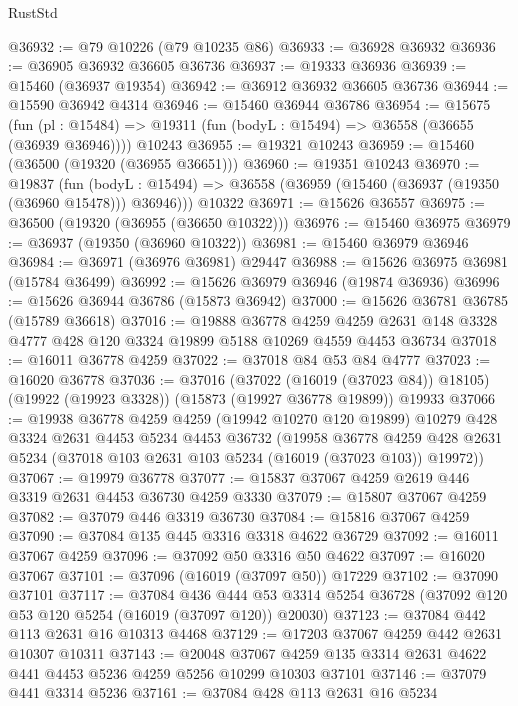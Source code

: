 \begin{lexlean}{RustStd}
\begin{coremodule}
@36932 := @79 @10226 (@79 @10235 @86)
@36933 := @36928 @36932
@36936 := @36905 @36932 @36605 @36736
@36937 := @19333 @36936
@36939 := @15460 (@36937 @19354)
@36942 := @36912 @36932 @36605 @36736
@36944 := @15590 @36942 @4314
@36946 := @15460 @36944 @36786
@36954 := @15675
    (fun (pl : @15484) => @19311 (fun (bodyL : @15494) => @36558 (@36655 (@36939 @36946))))
    @10243
@36955 := @19321 @10243
@36959 := @15460 (@36500 (@19320 (@36955 @36651)))
@36960 := @19351 @10243
@36970 := @19837
    (fun (bodyL : @15494) => @36558 (@36959 (@15460 (@36937 (@19350 (@36960 @15478))) @36946)))
    @10322
@36971 := @15626 @36557
@36975 := @36500 (@19320 (@36955 (@36650 @10322)))
@36976 := @15460 @36975
@36979 := @36937 (@19350 (@36960 @10322))
@36981 := @15460 @36979 @36946
@36984 := @36971 (@36976 @36981) @29447
@36988 := @15626 @36975 @36981 (@15784 @36499)
@36992 := @15626 @36979 @36946 (@19874 @36936)
@36996 := @15626 @36944 @36786 (@15873 @36942)
@37000 := @15626 @36781 @36785 (@15789 @36618)
@37016 := @19888
    @36778
    @4259
    @4259
    @2631
    @148
    @3328
    @4777
    @428
    @120
    @3324
    @19899
    @5188
    @10269
    @4559
    @4453
    @36734
@37018 := @16011 @36778 @4259
@37022 := @37018 @84 @53 @84 @4777
@37023 := @16020 @36778
@37036 := @37016
    (@37022 (@16019 (@37023 @84)) @18105)
    (@19922 (@19923 @3328))
    (@15873 (@19927 @36778 @19899))
    @19933
@37066 := @19938
    @36778
    @4259
    @4259
    (@19942 @10270 @120 @19899)
    @10279
    @428
    @3324
    @2631
    @4453
    @5234
    @4453
    @36732
    (@19958
      @36778
      @4259
      @428
      @2631
      @5234
      (@37018 @103 @2631 @103 @5234 (@16019 (@37023 @103)) @19972))
@37067 := @19979 @36778
@37077 := @15837 @37067 @4259 @2619 @446 @3319 @2631 @4453 @36730 @4259 @3330
@37079 := @15807 @37067 @4259
@37082 := @37079 @446 @3319 @36730
@37084 := @15816 @37067 @4259
@37090 := @37084 @135 @445 @3316 @3318 @4622 @36729
@37092 := @16011 @37067 @4259
@37096 := @37092 @50 @3316 @50 @4622
@37097 := @16020 @37067
@37101 := @37096 (@16019 (@37097 @50)) @17229
@37102 := @37090 @37101
@37117 := @37084
    @436
    @444
    @53
    @3314
    @5254
    @36728
    (@37092 @120 @53 @120 @5254 (@16019 (@37097 @120)) @20030)
@37123 := @37084 @442 @113 @2631 @16 @10313 @4468
@37129 := @17203 @37067 @4259 @442 @2631 @10307 @10311
@37143 := @20048
    @37067
    @4259
    @135
    @3314
    @2631
    @4622
    @441
    @4453
    @5236
    @4259
    @5256
    @10299
    @10303
    @37101
@37146 := @37079 @441 @3314 @5236
@37161 := @37084
    @428
    @113
    @2631
    @16
    @5234

\end{coremodule}
\end{lexlean}
